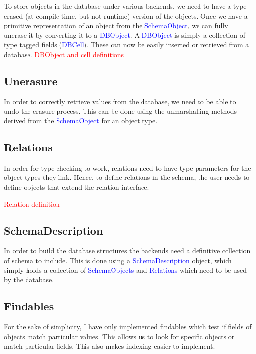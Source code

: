 \documentclass[12pt,a4paper,twoside,openright]{report}
\newcommand\todo[1]{\textcolor{red}{#1}}
\newcommand\codeName[1]{\textcolor{blue}{#1}}
\begin{document}
	To store objects in the database under various backends, we need to have a type erased (at compile time, but not runtime) version of the objects. Once we have a primitive representation of an object from the \codeName{SchemaObject}, we can fully unerase it by converting it to a \codeName{DBObject}. A \codeName{DBObject} is simply a collection of type tagged fields (\codeName{DBCell}). These can now be easily inserted or retrieved from a database.
	\todo{DBObject and cell definitions}
	
	\subsection{Unerasure}
	In order to correctly retrieve values from the database, we need to be able to undo the erasure process. This can be done using the unmarshalling methods derived from the \codeName{SchemaObject}  for an object type.
	\subsection{Relations}
	    In order for type checking to work, relations need to have type parameters for the object types they link. Hence, to define relations in the schema, the user needs to define objects that extend the relation interface.
	  
	    \todo{Relation definition}

	
	\subsection{SchemaDescription}
	
In order to build the database structures the backends need a definitive collection of schema to include. This is done using a \codeName{SchemaDescription} object, which simply holds a collection of \codeName{SchemaObjects} and \codeName{Relations} which need to be used by the database.	
	
	\subsection{Findables}
	For the sake of simplicity, I have only implemented findables which test if fields of objects match particular values. This allows us to look for specific objects or match particular fields. This also makes indexing easier to implement.
	
\end{document}
